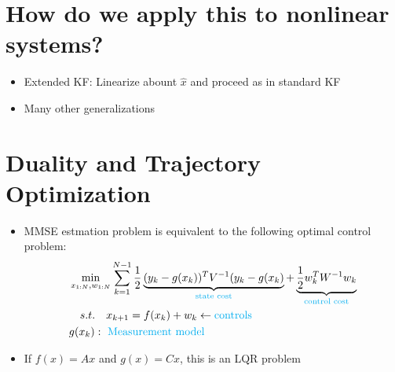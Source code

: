 \documentclass[11pt]{article}
\begin{document}
\section{How do we apply this to nonlinear systems?}
\begin{itemize}
    \item Extended KF: Linearize abount $\hat{x}$ and proceed as in standard KF
    \item Many other generalizations
\end{itemize}

\section{Duality and Trajectory Optimization}
\begin{itemize}
    \item MMSE estmation problem is equivalent to the following optimal control problem:
    \begin{align*}
        &\min_{x_{1:N},w_{1:N}}\sum_{k=1}^{N-1}\frac{1}{2}\underbrace{(y_k - g(x_k))^TV^{-1}(y_k-g(x_k)}_{\textcolor{cyan}{\text{state cost}}} + \underbrace{\frac{1}{2}w_k^TW^{-1}w_k}_{\textcolor{cyan}{\text{control cost}}}
        \\
        & \quad s.t. \quad x_{k+1} = f(x_k) + w_k\leftarrow \textcolor{cyan}{\text{controls}}
        \\
        &g(x_k):\textcolor{cyan}{\text{ Measurement model}}
    \end{align*}
    \item If $f(x) = Ax$ and $g(x) = Cx$, this is an LQR problem
\end{itemize}
\end{document}
